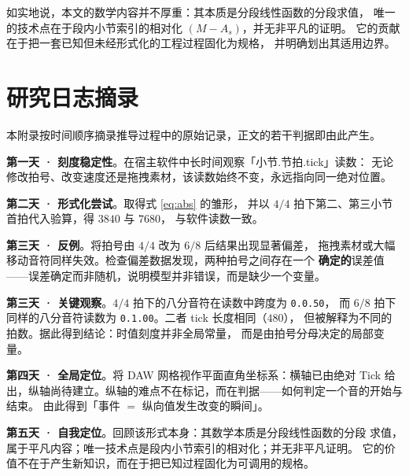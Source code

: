 \documentclass[11pt,a4paper,fontset=none]{ctexart}
\begin{document}
如实地说，本文的数学内容并不厚重：其本质是分段线性函数的分段求值，
唯一的技术点在于段内小节索引的相对化 $(M-A_s)$，并无非平凡的证明。
它的贡献在于把一套已知但未经形式化的工程过程固化为规格，
并明确划出其适用边界。




\appendix

\section{研究日志摘录}
本附录按时间顺序摘录推导过程中的原始记录，正文的若干判据即由此产生。

\begin{引述}
\textbf{第一天 · 刻度稳定性}。在宿主软件中长时间观察「小节.节拍.tick」读数：
无论修改拍号、改变速度还是拖拽素材，该读数始终不变，永远指向同一绝对位置。
\end{引述}

\begin{引述}
\textbf{第二天 · 形式化尝试}。取得式 \eqref{eq:abs} 的雏形，
并以 $4/4$ 拍下第二、第三小节首拍代入验算，得 $3840$ 与 $7680$，
与软件读数一致。
\end{引述}

\begin{引述}
\textbf{第三天 · 反例}。将拍号由 $4/4$ 改为 $6/8$ 后结果出现显著偏差，
拖拽素材或大幅移动音符同样失效。检查偏差数据发现，两种拍号之间存在一个
\textbf{确定的}误差值——误差确定而非随机，说明模型并非错误，而是缺少一个变量。
\end{引述}

\begin{引述}
\textbf{第三天 · 关键观察}。$4/4$ 拍下的八分音符在读数中跨度为 \texttt{0.0.50}，
而 $6/8$ 拍下同样的八分音符读数为 \texttt{0.1.00}。二者 tick 长度相同（$480$），
但被解释为不同的拍数。据此得到结论：时值刻度并非全局常量，
而是由拍号分母决定的局部变量。
\end{引述}

\begin{引述}
\textbf{第四天 · 全局定位}。将 DAW 网格视作平面直角坐标系：横轴已由绝对 Tick
给出，纵轴尚待建立。纵轴的难点不在标记，而在判据——如何判定一个音的开始与结束。
由此得到「事件 $=$ 纵向值发生改变的瞬间」。
\end{引述}

\begin{引述}
\textbf{第五天 · 自我定位}。回顾该形式本身：其数学本质是分段线性函数的分段
求值，属于平凡内容；唯一技术点是段内小节索引的相对化；并无非平凡证明。
它的价值不在于产生新知识，而在于把已知过程固化为可调用的规格。
\end{引述}
\end{document}
